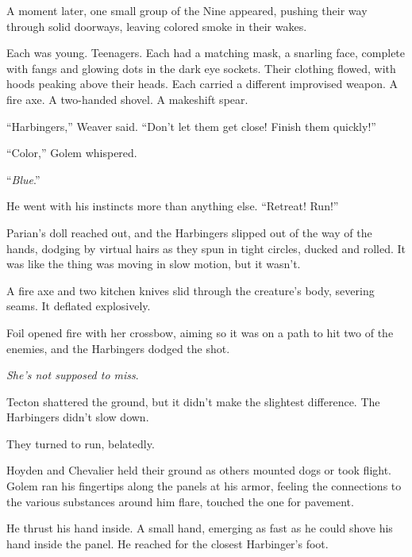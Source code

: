 A moment later, one small group of the Nine appeared, pushing their way through solid doorways, leaving colored smoke in their wakes.



Each was young.  Teenagers.  Each had a matching mask, a snarling face, complete with fangs and glowing dots in the dark eye sockets.  Their clothing flowed, with hoods peaking above their heads.  Each carried a different improvised weapon.  A fire axe.  A two-handed shovel.  A makeshift spear.



``Harbingers,'' Weaver said.  ``Don't let them get close!  Finish them quickly!''



``Color,'' Golem whispered.



``\emph{Blue}.''



He went with his instincts more than anything else.  ``Retreat!  Run!''



Parian's doll reached out, and the Harbingers slipped out of the way of the hands, dodging by virtual hairs as they spun in tight circles, ducked and rolled.  It was like the thing was moving in slow motion, but it wasn't.



A fire axe and two kitchen knives slid through the creature's body, severing seams.  It deflated explosively.



Foil opened fire with her crossbow, aiming so it was on a path to hit two of the enemies, and the Harbingers dodged the shot.



\emph{She's not supposed to miss}.



Tecton shattered the ground, but it didn't make the slightest difference.  The Harbingers didn't slow down.



They turned to run, belatedly.



Hoyden and Chevalier held their ground as others mounted dogs or took flight.  Golem ran his fingertips along the panels at his armor, feeling the connections to the various substances around him flare, touched the one for pavement.



He thrust his hand inside.  A small hand, emerging as fast as he could shove his hand inside the panel.  He reached for the closest Harbinger's foot.



